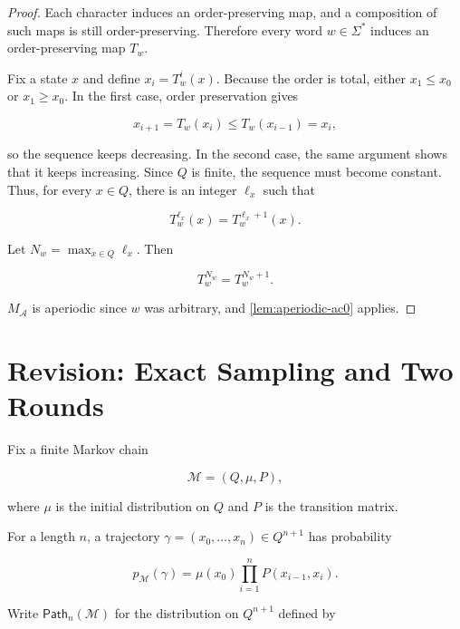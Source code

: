 \documentclass[10pt]{article}
\theoremstyle{definition}
\newcommand{\Path}{\mathsf{Path}}
\begin{document}
\begin{proof}
Each character induces an order-preserving map, and a composition of such maps
is still order-preserving.  Therefore every word $w\in\Sigma^*$ induces an
order-preserving map $T_w$.

Fix a state $x$ and define $x_i=T_w^i(x)$.  Because the order is total, either
$x_1\le x_0$ or $x_1\ge x_0$.  In the first case, order preservation gives

\begin{equation}
 x_{i+1}=T_w(x_i)\le T_w(x_{i-1})=x_i,
\end{equation}

so the sequence keeps decreasing.  In the second case, the same argument shows
that it keeps increasing.  Since $Q$ is finite, the sequence must become
constant.  Thus, for every $x\in Q$, there is an integer $\ell_x$ such that

\begin{equation}
 T_w^{\ell_x}(x)=T_w^{\ell_x+1}(x).
\end{equation}

Let $N_w=\max_{x\in Q}\ell_x$.  Then

\begin{equation}
 T_w^{N_w}=T_w^{N_w+1}.
\end{equation}

$M_{\mathcal A}$ is aperiodic since $w$ was arbitrary, and
\cref{lem:aperiodic-ac0} applies.
\end{proof}

\section{Revision: Exact Sampling and Two Rounds}
\label{sec:revision}
\label{sec:markov}

Fix a finite Markov chain

\begin{equation}
 \mathcal M=(Q,\mu,P),
\end{equation}

where $\mu$ is the initial distribution on $Q$ and $P$ is the transition
matrix.

For a length $n$, a trajectory $\gamma=(x_0,\ldots,x_n)\in Q^{n+1}$ has
probability

\begin{equation}
 p_{\mathcal M}(\gamma)
 =\mu(x_0)\prod_{i=1}^{n}P(x_{i-1},x_i).
 \label{eq:pathprob}
\end{equation}

Write $\Path_n(\mathcal M)$ for the distribution on $Q^{n+1}$ defined by
\end{document}
